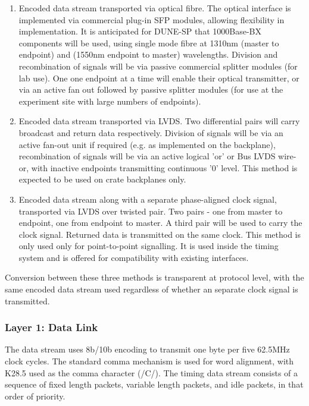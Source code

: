 \documentclass{dune}
\begin{document}
\begin{enumerate}
	\item Encoded data stream transported via optical fibre. The optical interface is implemented via commercial plug-in SFP modules, allowing flexibility in implementation. It is anticipated for DUNE-SP that 1000Base-BX components will be used, using single mode fibre at 1310nm (master to endpoint) and (1550nm endpoint to master) wavelengths. Division and recombination of signals will be via passive commercial splitter modules (for lab use). One one endpoint at a time will enable their optical transmitter, or via an active fan out followed by passive splitter modules (for use at the experiment site with large numbers of endpoints).
	\item Encoded data stream transported via LVDS. Two differential pairs will carry broadcast and return data respectively. Division of signals will be via an active fan-out unit if required (e.g. as implemented on the  backplane), recombination of signals will be via an active logical 'or' or Bus LVDS wire-or, with inactive endpoints transmitting continuous '0' level. This method is expected to be used on crate backplanes only.
	\item Encoded data stream along with a separate phase-aligned clock signal, transported via LVDS over twisted pair. Two pairs - one from master to endpoint, one from endpoint to master. A third pair will be used to carry the clock signal. Returned data is transmitted on the same clock. This method is only used only for point-to-point signalling. It is used inside the timing system and is offered for compatibility with existing interfaces.
\end{enumerate}

Conversion between these three methods is transparent at protocol level, with the same encoded data stream used regardless of whether an separate clock signal is transmitted.

\subsubsection{Layer 1: Data Link}
\label{section:data_link}

The data stream uses 8b/10b encoding to transmit one byte per five 62.5MHz clock cycles. The standard comma mechanism is used for word alignment, with K28.5 used as the comma character (/C/). The timing data stream consists of a sequence of fixed length packets, variable length packets, and idle packets, in that order of priority.
\end{document}
